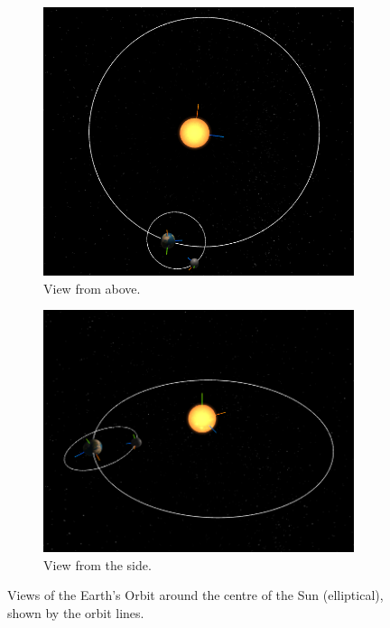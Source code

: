\documentclass[12pt]{article}
\begin{document}
\begin{figure}[H]
        \centering
        \begin{subfigure}[b]{0.4\textwidth}
                \includegraphics[width=\textwidth]{images/earthorbitsun1}
                \caption{View from above.}
                \label{fig: The Earth orbiting the Sun}
       \end{subfigure}
        \begin{subfigure}[b]{0.4\textwidth}
                \includegraphics[width=\textwidth]{images/earthorbitsun2}
                \caption{View from the side.}
                \label{fig:The Earth orbiting the Sun}
       \end{subfigure}
       \caption{Views of the Earth's Orbit around the centre of the Sun (elliptical), shown by the orbit lines.}\label{fig: The Earth orbitng the centre of the Sun}
\end{figure}
\end{document}
